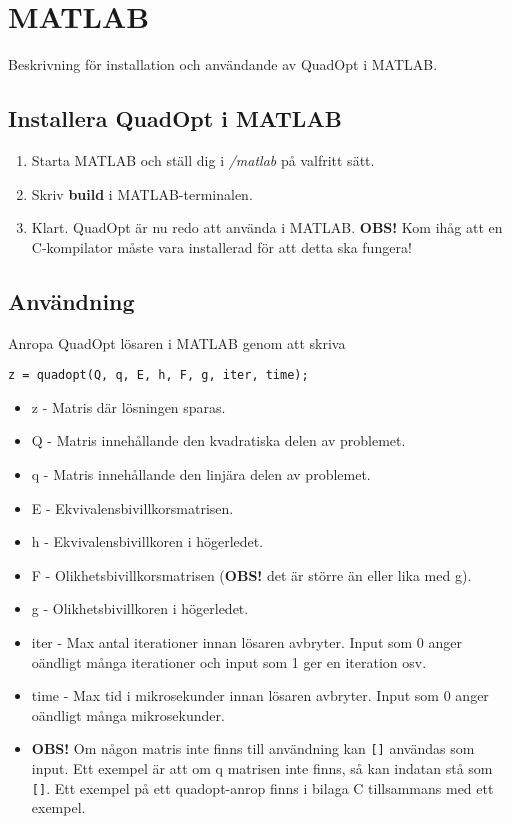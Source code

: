 \section{MATLAB}
Beskrivning för installation och användande av QuadOpt i MATLAB.

\subsection{Installera QuadOpt i MATLAB}
\begin{enumerate}
	\item Starta MATLAB och ställ dig i \emph{/matlab} på valfritt sätt. 
	\item Skriv \textbf{build} i MATLAB-terminalen.
	\item Klart. QuadOpt är nu redo att använda i MATLAB.
	\newline
	\newline
	\textbf{OBS!} Kom ihåg att en C-kompilator måste vara installerad för att detta ska fungera!
\end{enumerate}

\subsection{Användning}
Anropa QuadOpt lösaren i MATLAB genom att skriva

\begin{lstlisting}
z = quadopt(Q, q, E, h, F, g, iter, time);
\end{lstlisting}

\begin{itemize}
	\item z - Matris där lösningen sparas.
	\item Q - Matris innehållande den kvadratiska delen av problemet.
	\item q - Matris innehållande den linjära delen av problemet.
	\item E - Ekvivalensbivillkorsmatrisen.
	\item h - Ekvivalensbivillkoren i högerledet.
	\item F - Olikhetsbivillkorsmatrisen (\textbf{OBS!} det är större än eller lika med g).
	\item g - Olikhetsbivillkoren i högerledet.
	\item iter - Max antal iterationer innan lösaren avbryter. Input som 0 anger oändligt många iterationer och input som 1 ger en iteration osv. 
	\item time - Max tid i mikrosekunder innan lösaren avbryter. Input som 0 anger oändligt många mikrosekunder.
	\item \textbf{OBS!} Om någon matris inte finns till användning kan \texttt{[]} användas som input. Ett exempel är att om q matrisen inte finns, så kan indatan stå som \texttt{[]}. Ett exempel på ett quadopt-anrop finns i bilaga C tillsammans med ett exempel.
\end{itemize}
